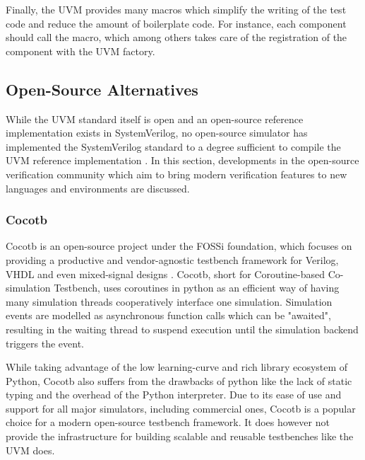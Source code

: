 Finally, the UVM provides many macros which simplify the writing of the test code and reduce the amount of
boilerplate code. For instance, each component should call the  macro, which among
others takes care of the registration of the component with the UVM factory.


\subsection{Open-Source Alternatives} %

While the UVM standard itself is open and an open-source reference implementation exists in SystemVerilog, no
open-source simulator has implemented the SystemVerilog standard to a degree sufficient to compile the UVM reference
implementation \cite{Sasselli2023}. In this section, developments in the open-source verification community which aim
to bring modern verification features to new languages and environments are discussed.

\subsubsection{Cocotb} %

Cocotb is an open-source project under the FOSSi foundation, which focuses on providing a productive and
vendor-agnostic testbench framework for Verilog, VHDL and even mixed-signal designs \cite{cocotb}. Cocotb, short for
Coroutine-based Co-simulation Testbench, uses coroutines in python as an efficient way of having many simulation
threads cooperatively interface one simulation. Simulation events are modelled as asynchronous function calls which
can be "awaited", resulting in the waiting thread to suspend execution until the simulation backend triggers the event.

While taking advantage of the low learning-curve and rich library ecosystem of Python, Cocotb also suffers from the
drawbacks of python like the lack of static typing and the overhead of the Python interpreter. Due to its ease of use
and support for all major simulators, including commercial ones, Cocotb is a popular choice for a modern open-source
testbench framework. It does however not provide the infrastructure for building scalable and reusable testbenches
like the UVM does.

